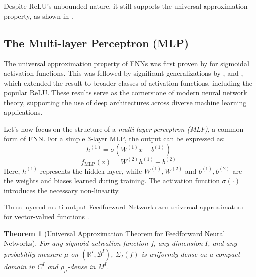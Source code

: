 \documentclass{article}
\newtheorem{theorem}{Theorem}
\theoremstyle{definition}
\theoremstyle{remark}
\newcounter{ct}
\begin{document}
Despite ReLU's unbounded nature, it still supports the universal approximation property, as shown in \citep{yarotsky2017error}.

\citep{mhaskar2019function}

\subsection{The Multi-layer Perceptron (MLP)}

The universal approximation property of FNNs was first proven by \citep{cybenko1989approximation} for sigmoidal activation functions. This was followed by significant generalizations by \citep{hornik1989multilayer}, \citep{funahashi1989approximate} and \citep{hechtnielsen1992backpropagation}, which extended the result to broader classes of activation functions, including the popular ReLU.
These results serve as the cornerstone of modern neural network theory, supporting the use of deep architectures across diverse machine learning applications.



Let’s now focus on the structure of a \textit{multi-layer perceptron (MLP)}, a common form of FNN. For a simple 3-layer MLP, the output can be expressed as:
\[
h^{(1)} = \sigma(W^{(1)} x + b^{(1)})
\]
\[
f_{\text{MLP}}(x) = W^{(2)} h^{(1)} + b^{(2)}
\]
Here, \(h^{(1)}\) represents the hidden layer, while \(W^{(1)}, W^{(2)}\) and \(b^{(1)}, b^{(2)}\) are the weights and biases learned during training. The activation function \(\sigma(\cdot)\) introduces the necessary non-linearity.


Three-layered multi-output Feedforward Networks are universal approximators for vector-valued functions \citep{irie1988capabilities}.

\begin{theorem}[Universal Approximation Theorem for Feedforward Neural Networks\citep{hornik1989multilayer,schafer2007uap}]
For any sigmoid activation function \( f \), any dimension \( I \), and any probability measure \( \mu \) on \( (\mathbb{R}^I, \mathcal{B}^I) \), \( \Sigma_I(f) \) is uniformly dense on a compact domain in \( C^I \) and \( \rho_{\mu} \)-dense in \( M^I \).
\end{theorem}
\end{document}
